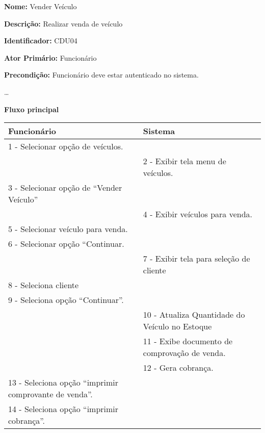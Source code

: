 \par
\textbf{Nome:} Vender Veículo 
\par
\textbf{Descrição:} Realizar venda de veículo 
\par 
\textbf{Identificador:} CDU04
\par
\textbf{Ator Primário:} Funcionário	
\par
\textbf{Precondição:} Funcionário deve estar autenticado no sistema.
\par	
\ldots
\par
\textbf{Fluxo principal}\par
\begin{tabular}{|p{7cm}|p{7cm}|}
	\hline 
	
	
	Funcionário
	& 
	
	Sistema
	\\ 
	\hline 
	
	
	1 - Selecionar opção de veículos.
	&  \\ 
	\hline 
	& 
	
	2 - Exibir tela menu de veículos.
	\\ 
	\hline 
	
	
	3 - Selecionar opção de “Vender Veículo”
	&  \\ 
	\hline 
	& 
	
	4 - Exibir veículos para venda.
	\\ 
	\hline 
	
	
	5 - Selecionar veículo para venda.
	&  \\ 
	\hline 
	
	
	6 - Selecionar opção “Continuar.
	&  \\ 
	\hline 
	& 
	
	7 - Exibir tela para seleção de cliente
	\\ 
	\hline 
	
	
	8 - Seleciona cliente
	&  \\ 
	\hline 
	
	
	9 - Seleciona opção “Continuar”. 
	&  \\ 
	\hline 
	& 
	
	10 - Atualiza Quantidade do Veículo no Estoque
	\\ 
	\hline 
	& 
	
	11 - Exibe documento de comprovação de venda. 
	\\ 
	\hline 
	& 
	
	12 - Gera cobrança.
	\\ 
	\hline 
	
	
	13 - Seleciona opção “imprimir comprovante de venda”.
	&  \\ 
	\hline 
	
	
	14 - Seleciona opção “imprimir cobrança”.
	&  \\ 
	\hline 
\end{tabular}  
\vspace{12px}


